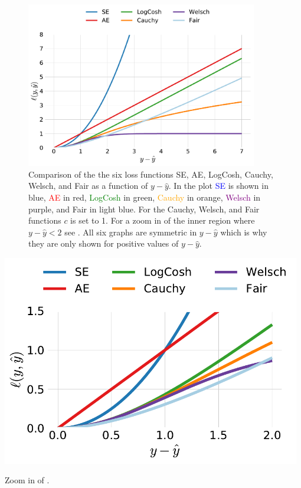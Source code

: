 \begin{figure}
  \includegraphics[width=0.9\textwidth]{figures/objective_functions/objective_functions.pdf}
  \caption[Comparison of different objective functions.]
    {Comparison of the the six loss functions SE, AE, LogCosh, Cauchy, Welsch, and Fair as a function of $y-\hat{y}$. In the plot \textcolor{blue}{SE} is shown in blue, \textcolor{red}{AE} in red, \textcolor{green}{LogCosh} in green, \textcolor{orange}{Cauchy} in orange, \textcolor{purple}{Welsch} in purple, and \textcolor{light-blue}{Fair} in light blue. For the Cauchy, Welsch, and Fair functions $c$ is set to 1. For a zoom in of the inner region 
    where $y-\hat{y}<2$ see . All six graphs are symmetric in $y-\hat{y}$ which is why they are only shown for positive values of $y-\hat{y}$.
    }
  \label{fig:ml:objective_funcs}
\end{figure}

\begin{marginfigure}
  \includegraphics[width=0.98\textwidth]{figures/objective_functions/objective_functions_zoom.pdf}
  \caption[Comparison of different objective functions zoom in.]
    {Zoom in of . 
    }
  \label{fig:ml:objective_funcs_zoom}
\end{marginfigure}

